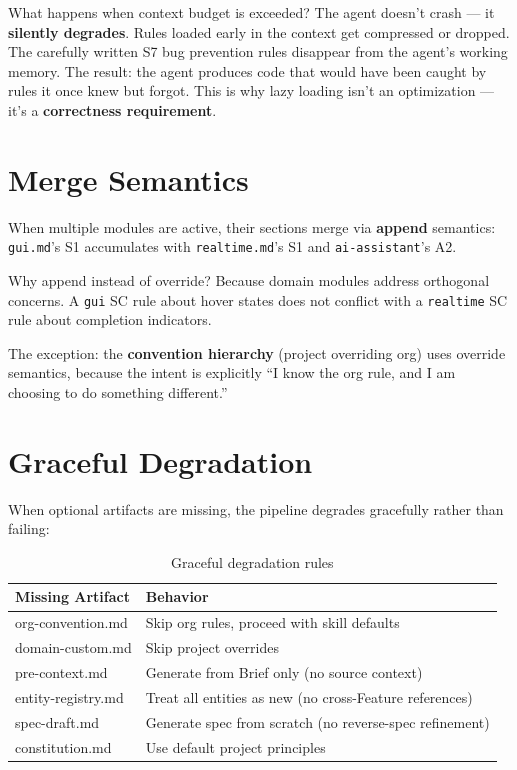 \documentclass[11pt,a4paper,openright,twoside]{report}
\begin{document}
What happens when context budget is exceeded? The agent doesn't crash --- it \textbf{silently degrades}. Rules loaded early in the context get compressed or dropped. The carefully written S7 bug prevention rules disappear from the agent's working memory. The result: the agent produces code that would have been caught by rules it once knew but forgot. This is why lazy loading isn't an optimization --- it's a \textbf{correctness requirement}.

\section{Merge Semantics}

When multiple modules are active, their sections merge via \textbf{append} semantics: \texttt{gui.md}'s S1 accumulates with \texttt{realtime.md}'s S1 and \texttt{ai-assistant}'s A2.

Why append instead of override? Because domain modules address orthogonal concerns. A \texttt{gui} SC rule about hover states does not conflict with a \texttt{realtime} SC rule about completion indicators.

The exception: the \textbf{convention hierarchy} (project overriding org) uses override semantics, because the intent is explicitly ``I know the org rule, and I am choosing to do something different.''

\section{Graceful Degradation}

When optional artifacts are missing, the pipeline degrades gracefully rather than failing:

\begin{table}[H]
\centering
\caption{Graceful degradation rules}
\label{tab:degradation}
\begin{tabularx}{\textwidth}{lX}
\toprule
\textbf{Missing Artifact} & \textbf{Behavior} \\
\midrule
org-convention.md & Skip org rules, proceed with skill defaults \\
domain-custom.md & Skip project overrides \\
pre-context.md & Generate from Brief only (no source context) \\
entity-registry.md & Treat all entities as new (no cross-Feature references) \\
spec-draft.md & Generate spec from scratch (no reverse-spec refinement) \\
constitution.md & Use default project principles \\
\bottomrule
\end{tabularx}
\end{table}
\end{document}
